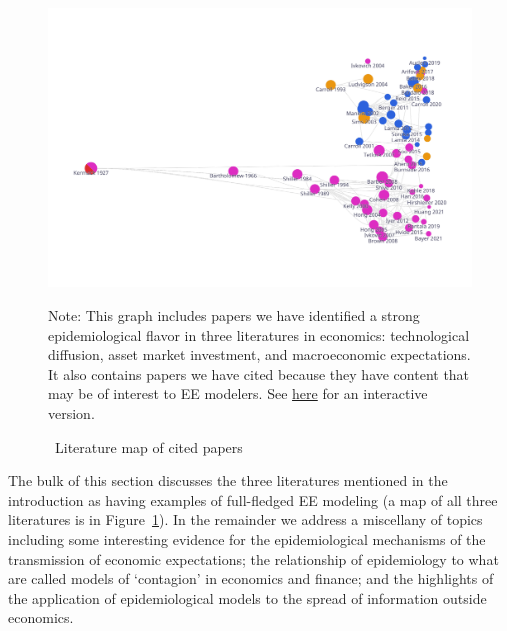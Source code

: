 \begin{figure}[!ht] \centering  %
  \caption{ ~Literature map of cited papers}
  \label{fig:graph_mixer}
  \centerline{\includegraphics[width=\textwidth]{./figures/graph_mixer}}
  \begin{flushleft}
    {\footnotesize Note: This graph includes papers we have identified a strong epidemiological flavor in three literatures in economics: technological diffusion, asset market investment, and macroeconomic expectations.  It also contains papers we have cited because they have content that may be of interest to EE modelers. See \href{https://app.litmaps.co/shared/5B586E15-0D7D-4BE7-A620-98C727F4E065}{here} for an interactive version.}
  \end{flushleft}
\end{figure}

The bulk of this section discusses the three literatures mentioned in the introduction as having examples of full-fledged EE modeling (a map of all three literatures is in Figure~\ref{fig:graph_mixer}).  In the remainder we address a miscellany of topics including some interesting evidence for the epidemiological mechanisms of the transmission of economic expectations; the relationship of epidemiology to what are called models of `contagion' in economics and finance; and the highlights of the application of epidemiological models to the spread of information outside economics.




